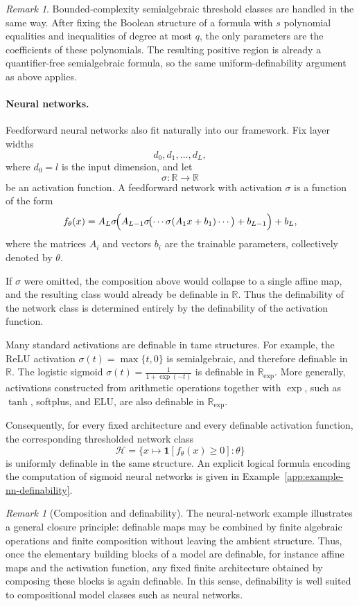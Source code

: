 \documentclass[11pt]{article}
\theoremstyle{plain}
\theoremstyle{definition}
\theoremstyle{remark}
\newtheorem{remark}[theorem]{Remark}
\newtheorem*{remark*}{Remark}
\newcommand{\R}{\mathbb{R}}
\begin{document}
\begin{remark*}
Bounded-complexity semialgebraic threshold classes are handled in the same way.
After fixing the Boolean structure of a formula with \(s\) polynomial equalities
and inequalities of degree at most \(q\), the only parameters are the
coefficients of these polynomials. The resulting positive region is already a
quantifier-free semialgebraic formula, so the same uniform-definability argument
as above applies.
\end{remark*}


\paragraph{Neural networks.}

Feedforward neural networks also fit naturally into our framework. Fix layer
widths
\[
d_0,d_1,\dots,d_L,
\]
where \(d_0=l\) is the input dimension, and let
\[
\sigma\colon \R\to\R
\]
be an activation function. A feedforward network with activation \(\sigma\) is
a function of the form
\[
f_\theta(x)
=
A_L
\sigma\!\Bigl(
A_{L-1}
\sigma\!\bigl(
\cdots
\sigma(A_1x+b_1)
\cdots
\bigr)
+b_{L-1}
\Bigr)
+b_L,
\]
where the matrices \(A_i\) and vectors \(b_i\) are the trainable parameters,
collectively denoted by \(\theta\).

If \(\sigma\) were omitted, the composition above would collapse to a single
affine map, and the resulting class would already be definable in \(\R\).
Thus the definability of the network class is determined entirely by the
definability of the activation function.

Many standard activations are definable in tame structures. For example, the
ReLU activation \(\sigma(t)=\max\{t,0\}\) is semialgebraic, and therefore
definable in \(\R\). The logistic sigmoid
\(\sigma(t)=\frac{1}{1+\exp(-t)}\) is definable in \(\R_{\exp}\). More
generally, activations constructed from arithmetic operations together with
\(\exp\), such as \(\tanh\), softplus, and ELU, are also definable in
\(\R_{\exp}\).

Consequently, for every fixed architecture and every definable activation
function, the corresponding thresholded network class
\[
\mathcal H
=
\{x\mapsto \mathbf 1[f_\theta(x)\ge 0] : \theta\}
\]
is uniformly definable in the same structure. An explicit logical formula encoding the computation of sigmoid neural
networks is given in Example~\ref{app:example-nn-definability}.

\begin{remark}[Composition and definability]
The neural-network example illustrates a general closure principle: definable
maps may be combined by finite algebraic operations and finite composition
without leaving the ambient structure. Thus, once the elementary building
blocks of a model are definable, for instance affine maps and the activation
function, any fixed finite architecture obtained by composing these blocks is
again definable. In this sense, definability is well suited to compositional
model classes such as neural networks.
\end{remark}
\end{document}
